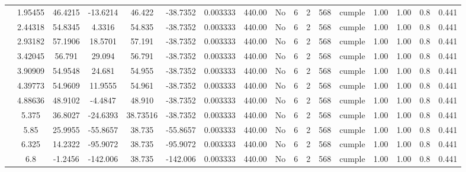 \begin{table}[H]
{\begin{tabular}{|c|c|c|c|c|c|c|c|c|c|c|c|c|c|c|c|c|}
\cline{2-17}    & 1.95455 & 46.4215 & -13.6214 & 46.422 & -38.7352 & 0.003333 & 440.00 & No  & 6   & 2   & 568 & \cellcolor[rgb]{ .776,  .937,  .808}cumple & 1.00 & 1.00 & 0.8 & 0.441 \bigstrut\\
\cline{2-17}    & 2.44318 & 54.8345 & 4.3316 & 54.835 & -38.7352 & 0.003333 & 440.00 & No  & 6   & 2   & 568 & \cellcolor[rgb]{ .776,  .937,  .808}cumple & 1.00 & 1.00 & 0.8 & 0.441 \bigstrut\\
\cline{2-17}    & 2.93182 & 57.1906 & 18.5701 & 57.191 & -38.7352 & 0.003333 & 440.00 & No  & 6   & 2   & 568 & \cellcolor[rgb]{ .776,  .937,  .808}cumple & 1.00 & 1.00 & 0.8 & 0.441 \bigstrut\\
\cline{2-17}    & 3.42045 & 56.791 & 29.094 & 56.791 & -38.7352 & 0.003333 & 440.00 & No  & 6   & 2   & 568 & \cellcolor[rgb]{ .776,  .937,  .808}cumple & 1.00 & 1.00 & 0.8 & 0.441 \bigstrut\\
\cline{2-17}    & 3.90909 & 54.9548 & 24.681 & 54.955 & -38.7352 & 0.003333 & 440.00 & No  & 6   & 2   & 568 & \cellcolor[rgb]{ .776,  .937,  .808}cumple & 1.00 & 1.00 & 0.8 & 0.441 \bigstrut\\
\cline{2-17}    & 4.39773 & 54.9609 & 11.9555 & 54.961 & -38.7352 & 0.003333 & 440.00 & No  & 6   & 2   & 568 & \cellcolor[rgb]{ .776,  .937,  .808}cumple & 1.00 & 1.00 & 0.8 & 0.441 \bigstrut\\
\cline{2-17}    & 4.88636 & 48.9102 & -4.4847 & 48.910 & -38.7352 & 0.003333 & 440.00 & No  & 6   & 2   & 568 & \cellcolor[rgb]{ .776,  .937,  .808}cumple & 1.00 & 1.00 & 0.8 & 0.441 \bigstrut\\
\cline{2-17}    & 5.375 & 36.8027 & -24.6393 & 38.73516 & -38.7352 & 0.003333 & 440.00 & No  & 6   & 2   & 568 & \cellcolor[rgb]{ .776,  .937,  .808}cumple & 1.00 & 1.00 & 0.8 & 0.441 \bigstrut\\
\cline{2-17}    & 5.85 & 25.9955 & -55.8657 & 38.735 & -55.8657 & 0.003333 & 440.00 & No  & 6   & 2   & 568 & \cellcolor[rgb]{ .776,  .937,  .808}cumple & 1.00 & 1.00 & 0.8 & 0.441 \bigstrut\\
\cline{2-17}    & 6.325 & 14.2322 & -95.9072 & 38.735 & -95.9072 & 0.003333 & 440.00 & No  & 6   & 2   & 568 & \cellcolor[rgb]{ .776,  .937,  .808}cumple & 1.00 & 1.00 & 0.8 & 0.441 \bigstrut\\
\cline{2-17}    & \cellcolor[rgb]{ .851,  .882,  .949}6.8 & -1.2456 & -142.006 & 38.735 & -142.006 & 0.003333 & 440.00 & No  & 6   & 2   & 568 & \cellcolor[rgb]{ .776,  .937,  .808}cumple & 1.00 & 1.00 & 0.8 & 0.441 \bigstrut\\

\end{tabular}}
\end{table}
